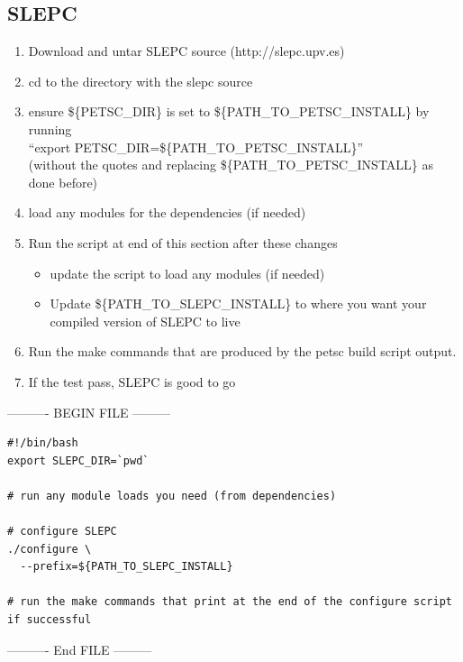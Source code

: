 \documentclass{article}
\begin{document}
\subsection{SLEPC} %
\label{sub:slepc}

\begin{enumerate}
  \item Download and untar SLEPC source (http://slepc.upv.es)
  \item cd to the directory with the slepc source
  \item ensure \$\{PETSC\_DIR\} is set to \$\{PATH\_TO\_PETSC\_INSTALL\} by running \\``export PETSC\_DIR=\$\{PATH\_TO\_PETSC\_INSTALL\}'' \\(without the quotes and replacing \$\{PATH\_TO\_PETSC\_INSTALL\} as done before)
  \item load any modules for the dependencies (if needed)
  \item Run the script at end of this section after these changes
  \begin{itemize}
    \item update the script to load any modules (if needed)
    \item Update \$\{PATH\_TO\_SLEPC\_INSTALL\} to where you want your compiled version of SLEPC to live
  \end{itemize}
  \item Run the make commands that are produced by the petsc build script output.
  \item If the test pass, SLEPC is good to go
\end{enumerate}

---------- BEGIN FILE ---------
\begin{verbatim}
#!/bin/bash
export SLEPC_DIR=`pwd`

# run any module loads you need (from dependencies)

# configure SLEPC
./configure \
  --prefix=${PATH_TO_SLEPC_INSTALL}

# run the make commands that print at the end of the configure script if successful
\end{verbatim}
---------- End FILE ---------
\end{document}

